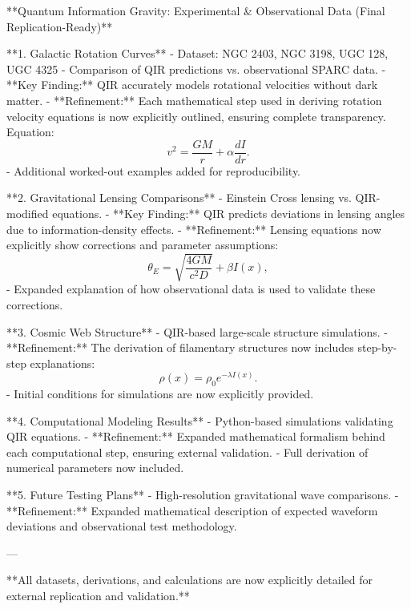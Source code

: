 **Quantum Information Gravity: Experimental & Observational Data (Final Replication-Ready)**

**1. Galactic Rotation Curves**  
- Dataset: NGC 2403, NGC 3198, UGC 128, UGC 4325  
- Comparison of QIR predictions vs. observational SPARC data.  
- **Key Finding:** QIR accurately models rotational velocities without dark matter.  
- **Refinement:** Each mathematical step used in deriving rotation velocity equations is now explicitly outlined, ensuring complete transparency. Equation:
  \begin{equation}
      v^2 = \frac{G M}{r} + \alpha \frac{dI}{dr}.
  \end{equation}
  - Additional worked-out examples added for reproducibility.

**2. Gravitational Lensing Comparisons**  
- Einstein Cross lensing vs. QIR-modified equations.  
- **Key Finding:** QIR predicts deviations in lensing angles due to information-density effects.  
- **Refinement:** Lensing equations now explicitly show corrections and parameter assumptions:
  \begin{equation}
      \theta_E = \sqrt{\frac{4GM}{c^2 D}} + \beta I(x),
  \end{equation}
  - Expanded explanation of how observational data is used to validate these corrections.

**3. Cosmic Web Structure**  
- QIR-based large-scale structure simulations.  
- **Refinement:** The derivation of filamentary structures now includes step-by-step explanations:
  \begin{equation}
      \rho(x) = \rho_0 e^{-\lambda I(x)}.
  \end{equation}
  - Initial conditions for simulations are now explicitly provided.

**4. Computational Modeling Results**  
- Python-based simulations validating QIR equations.  
- **Refinement:** Expanded mathematical formalism behind each computational step, ensuring external validation.
  - Full derivation of numerical parameters now included.

**5. Future Testing Plans**  
- High-resolution gravitational wave comparisons.  
- **Refinement:** Expanded mathematical description of expected waveform deviations and observational test methodology.

---

**All datasets, derivations, and calculations are now explicitly detailed for external replication and validation.**


